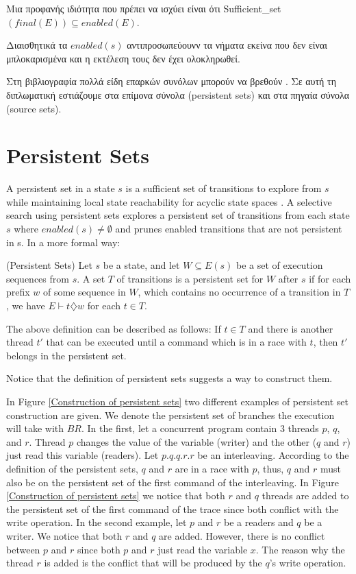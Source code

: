 Μια προφανής ιδιότητα που πρέπει να ισχύει είναι ότι Sufficient\_set$(final(E)) \subseteq enabled(E)$.

Διαισθητικά τα $enabled(s)$ αντιπροσωπεύουνν τα νήματα εκείνα που δεν είναι μπλοκαρισμένα και η εκτέλεση τους δεν έχει ολοκληρωθεί.

Στη βιβλιογραφία πολλά είδη επαρκών συνόλων μπορούν να βρεθούν \cite{Godefroid1996}. 
Σε αυτή τη διπλωματική εστιάζουμε στα επίμονα σύνολα (persistent sets) και στα πηγαία σύνολα (source sets).


\section{Persistent Sets}

A persistent set in a state $s$ is a sufficient set of transitions to
explore from $s$ while maintaining local state reachability for acyclic state spaces \cite{God97}. A selective search using persistent
sets explores a persistent set of transitions from each state $s$ where $enabled(s) \neq \emptyset$ and prunes enabled transitions that
are not persistent in s.
In a more formal way:\\

\begin{definition}{(Persistent Sets)}
Let $s$ be a state, and let $W \subseteq E(s)$ be a set
of execution sequences from $s$. A set $T$ of transitions is a persistent set for $W$
after $s$ if for each prefix $w$ of some sequence in $W$, which contains no occurrence
of a transition in $T$,  we have $E \vdash t \diamondsuit w$ for each $t \in T$.
\end{definition}

The above definition can be described as follows: If $t \in T$ and there is another thread $t'$ that can be executed until a command which
is in a race with $t$, then $t'$ belongs in the persistent set.

Notice that the definition of persistent sets suggests a way to construct them.

In Figure \ref{Construction of persistent sets} two different examples of persistent set construction are given. We denote the persistent set of branches the execution will take with $BR{}$.
In the first, let a concurrent program contain 3 threads $p$, $q$, and $r$. Thread $p$ changes the value of the variable (writer) and the other ($q$ and $r$) just read this variable (readers).
Let $p.q.q.r.r$ be an interleaving. According to the definition of the persistent sets, $q$ and $r$ are in a race with $p$, thus, $q$ and $r$ must also be on the persistent set
of the first command of the interleaving. In Figure \ref{Construction of persistent sets} we notice that both $r$ and $q$ threads are added to the persistent set of the first
command of the trace since both conflict with the write operation. 
In the second example, let $p$ and $r$  be a readers and $q$ be a writer. We notice that both $r$ and $q$ are added. However, there is no conflict between $p$ and $r$ since both $p$ and $r$
just read the variable $x$. The reason why the thread $r$ is added is the conflict that will be produced by the $q$'s write operation.

